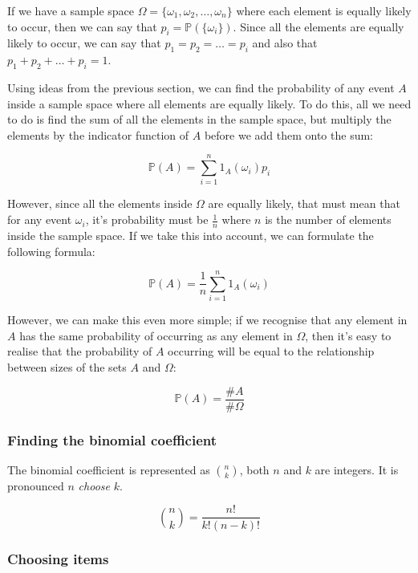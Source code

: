 If we have a sample space $\Omega = \{ \omega_1, \omega_2, \dots, \omega_n \}$
where each element is equally likely to occur, then we can say that $p_i =
\mathbb{P}(\{\omega_i\})$. Since all the elements are equally likely to occur,
we can say that $p_1 = p_2 = \dots = p_i$ and also that $p_1 + p_2 + \dots + p_i
= 1$.

Using ideas from the previous section, we can find the probability of any event
$A$ inside a sample space where all elements are equally likely. To do this, all
we need to do is find the sum of all the elements in the sample space, but
multiply the elements by the indicator function of $A$ before we add them onto
the sum:

\begin{dmath*}
	\mathbb{P}(A) = \sum\limits_{i=1}^{n} 1_A(\omega_i)p_i
\end{dmath*}

However, since all the elements inside $\Omega$ are equally likely, that must
mean that for any event $\omega_i$, it's probability must be $\frac{1}{n}$ where
$n$ is the number of elements inside the sample space. If we take this into
account, we can formulate the following formula:

\begin{dmath*}
	\mathbb{P}(A) = \frac{1}{n}\sum\limits_{i=1}^{n} 1_A(\omega_i)
\end{dmath*}


However, we can make this even more simple; if we recognise that any element in
$A$ has the same probability of occurring as any element in $\Omega$, then it's
easy to realise that the probability of $A$ occurring will be equal to the
relationship between sizes of the sets $A$ and $\Omega$:

\begin{dmath*}
	\mathbb{P}(A) = \frac{\#A}{\#\Omega}
\end{dmath*}

\subsubsection{Finding the binomial coefficient}

The binomial coefficient is represented as $n \choose k$, both $n$ and $k$ are
integers. It is pronounced $n$ {\it choose} $k$.

\begin{dmath*}
	{n \choose k} = \frac{n!}{k!(n-k)!}
\end{dmath*}

\subsubsection{Choosing items}


